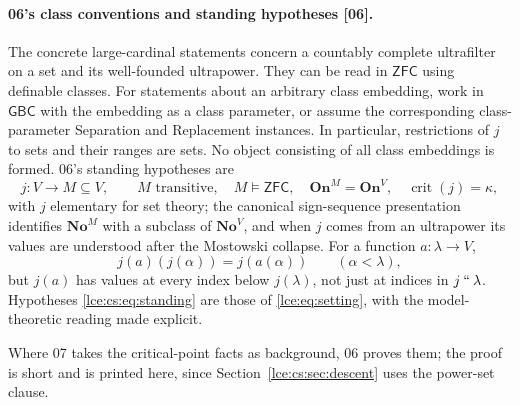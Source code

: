 \documentclass[11pt,letterpaper]{article}
\numberwithin{equation}{section}
\theoremstyle{definition}
\theoremstyle{remark}
\newcommand{\No}{\mathbf{No}}
\newcommand{\On}{\mathbf{On}}
\newcommand{\crit}{\operatorname{crit}}
\newcommand{\imset}[2]{#1\mathbin{``}#2}
\newcommand{\ZFC}{\mathsf{ZFC}}
\newcommand{\GBC}{\mathsf{GBC}}
\newcommand{\src}[1]{\textup{\textsf{\small[#1]}}}%
\begin{document}
\paragraph{06's class conventions and standing hypotheses \src{06}.} The
concrete large-cardinal statements concern a countably complete ultrafilter
on a set and its well-founded ultrapower. They can be read in $\ZFC$ using
definable classes. For statements about an arbitrary class embedding, work
in $\GBC$ with the embedding as a class parameter, or assume the
corresponding class-parameter Separation and Replacement instances. In
particular, restrictions of $j$ to sets and their ranges are sets. No object
consisting of all class embeddings is formed. 06's standing hypotheses are
\begin{equation}\label{lce:cs:eq:standing}
 j:V\longrightarrow M\subseteq V,
 \qquad M\text{ transitive},\quad M\models\ZFC,
 \quad\On^M=\On^V,
 \quad\crit(j)=\kappa,
\end{equation}
with $j$ elementary for set theory; the canonical sign-sequence presentation
identifies $\No^M$ with a subclass of $\No^V$, and when $j$ comes from an
ultrapower its values are understood after the Mostowski collapse. For a
function $a:\lambda\to V$,
\begin{equation}\label{lce:cs:eq:array-evaluation}
 j(a)(j(\alpha))=j(a(\alpha))\qquad(\alpha<\lambda),
\end{equation}
but $j(a)$ has values at every index below $j(\lambda)$, not just at
indices in $\imset j\lambda$. Hypotheses \eqref{lce:cs:eq:standing} are
those of \eqref{lce:eq:setting}, with the model-theoretic reading made
explicit.

Where 07 takes the critical-point facts as background, 06 proves them; the
proof is short and is printed here, since Section~\ref{lce:cs:sec:descent}
uses the power-set clause.
\end{document}
